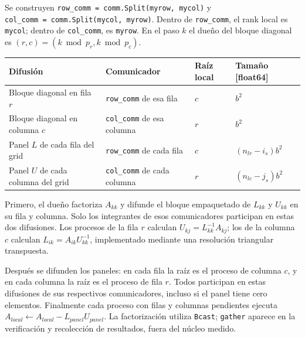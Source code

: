 \documentclass[
  spanish,
  11pt,
  a4paper,
]{article}
\newcounter{none} %
\begin{document}
Se construyen \texttt{row\_comm\ =\ comm.Split(myrow,\ mycol)} y
\texttt{col\_comm\ =\ comm.Split(mycol,\ myrow)}. Dentro de
\texttt{row\_comm}, el rank local es \texttt{mycol}; dentro de
\texttt{col\_comm}, es \texttt{myrow}. En el paso \(k\) el dueño del
bloque diagonal es \((r,c)=(k\bmod p_r,k\bmod p_c)\).

{\def\LTcaptype{none} %
\begin{longtable}[]{@{}
  >{\raggedright\arraybackslash}p{}
  >{\raggedright\arraybackslash}p{}
  >{\raggedright\arraybackslash}p{}
  >{\raggedright\arraybackslash}p{}@{}}
\toprule\noalign{}
\begin{minipage}[b]{\linewidth}\raggedright
Difusión
\end{minipage} & \begin{minipage}[b]{\linewidth}\raggedright
Comunicador
\end{minipage} & \begin{minipage}[b]{\linewidth}\raggedright
Raíz local
\end{minipage} & \begin{minipage}[b]{\linewidth}\raggedright
Tamaño {[}float64{]}
\end{minipage} \\
\midrule\noalign{}
\endhead
\bottomrule\noalign{}
\endlastfoot
Bloque diagonal en fila \(r\) & \texttt{row\_comm} de esa fila & \(c\) &
\(b^2\) \\
Bloque diagonal en columna \(c\) & \texttt{col\_comm} de esa columna &
\(r\) & \(b^2\) \\
Panel \(L\) de cada fila del grid & \texttt{row\_comm} de cada fila &
\(c\) & \((n_{lr}-i_s)b^2\) \\
Panel \(U\) de cada columna del grid & \texttt{col\_comm} de cada
columna & \(r\) & \((n_{lc}-j_s)b^2\) \\
\end{longtable}
}

Primero, el dueño factoriza \(A_{kk}\) y difunde el bloque empaquetado
de \(L_{kk}\) y \(U_{kk}\) en su fila y columna. Solo los integrantes de
esos comunicadores participan en estas dos difusiones. Los procesos de
la fila \(r\) calculan \(U_{kj}=L_{kk}^{-1}A_{kj}\); los de la columna
\(c\) calculan \(L_{ik}=A_{ik}U_{kk}^{-1}\), implementado mediante una
resolución triangular transpuesta.

Después se difunden los paneles: en cada fila la raíz es el proceso de
columna \(c\), y en cada columna la raíz es el proceso de fila \(r\).
Todos participan en estas difusiones de sus respectivos comunicadores,
incluso si el panel tiene cero elementos. Finalmente cada proceso con
filas y columnas pendientes ejecuta
\(A_{local}\leftarrow A_{local}-L_{panel}U_{panel}\). La factorización
utiliza \texttt{Bcast}; \texttt{gather} aparece en la verificación y
recolección de resultados, fuera del núcleo medido.
\end{document}
